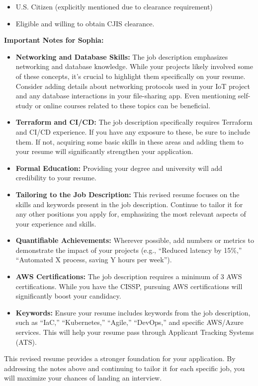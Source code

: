 \documentclass[
]{article}
\providecommand{\tightlist}{%
  \setlength{\itemsep}{0pt}\setlength{\parskip}{0pt}}
\begin{document}
\begin{itemize}
\tightlist
\item
  U.S. Citizen (explicitly mentioned due to clearance requirement)
\item
  Eligible and willing to obtain CJIS clearance.
\end{itemize}

\textbf{Important Notes for Sophia:}

\begin{itemize}
\tightlist
\item
  \textbf{Networking and Database Skills:} The job description
  emphasizes networking and database knowledge. While your projects
  likely involved some of these concepts, it's crucial to highlight them
  specifically on your resume. Consider adding details about networking
  protocols used in your IoT project and any database interactions in
  your file-sharing app. Even mentioning self-study or online courses
  related to these topics can be beneficial.
\item
  \textbf{Terraform and CI/CD:} The job description specifically
  requires Terraform and CI/CD experience. If you have any exposure to
  these, be sure to include them. If not, acquiring some basic skills in
  these areas and adding them to your resume will significantly
  strengthen your application.
\item
  \textbf{Formal Education:} Providing your degree and university will
  add credibility to your resume.
\item
  \textbf{Tailoring to the Job Description:} This revised resume focuses
  on the skills and keywords present in the job description. Continue to
  tailor it for any other positions you apply for, emphasizing the most
  relevant aspects of your experience and skills.
\item
  \textbf{Quantifiable Achievements:} Wherever possible, add numbers or
  metrics to demonstrate the impact of your projects (e.g., ``Reduced
  latency by 15\%,'' ``Automated X process, saving Y hours per week'').
\item
  \textbf{AWS Certifications:} The job description requires a minimum of
  3 AWS certifications. While you have the CISSP, pursuing AWS
  certifications will significantly boost your candidacy.
\item
  \textbf{Keywords:} Ensure your resume includes keywords from the job
  description, such as ``IaC,'' ``Kubernetes,'' ``Agile,'' ``DevOps,''
  and specific AWS/Azure services. This will help your resume pass
  through Applicant Tracking Systems (ATS).
\end{itemize}

This revised resume provides a stronger foundation for your application.
By addressing the notes above and continuing to tailor it for each
specific job, you will maximize your chances of landing an interview.
\end{document}
